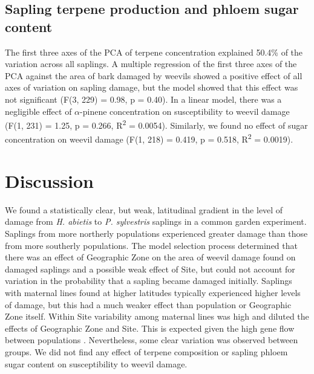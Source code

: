 \documentclass[a4paper, 11pt]{article}
\begin{document}
\subsection*{Sapling terpene production and phloem sugar content}

The first three axes of the PCA of terpene concentration explained 50.4\% of the variation across all saplings. A multiple regression of the first three axes of the PCA against the area of bark damaged by weevils showed a positive effect of all axes of variation on sapling damage, but the model showed that this effect was not significant (F(3, 229) = 0.98, p = 0.40). In a linear model, there was a negligible effect of $\alpha$-pinene concentration on susceptibility to weevil damage (F(1, 231) = 1.25, p = 0.266, R\textsuperscript{2} = 0.0054). Similarly, we found no effect of sugar concentration on weevil damage (F(1, 218) = 0.419, p = 0.518, R\textsuperscript{2} = 0.0019). 

\section*{Discussion}

We found a statistically clear, but weak, latitudinal gradient in the level of damage from \textit{H. abietis} to \textit{P. sylvestris} saplings in a common garden experiment. Saplings from more northerly populations experienced greater damage than those from more southerly populations. The model selection process determined that there was an effect of Geographic Zone on the area of weevil damage found on damaged saplings and a possible weak effect of Site, but could not account for variation in the probability that a sapling became damaged initially. Saplings with maternal lines found at higher latitudes typically experienced higher levels of damage, but this had a much weaker effect than population or Geographic Zone itself. Within Site variability among maternal lines was high and diluted the effects of Geographic Zone and Site. This is expected given the high gene flow between populations \citep{Donnelly2018}. Nevertheless, some clear variation was observed between groups. We did not find any effect of terpene composition or sapling phloem sugar content on susceptibility to weevil damage.
\end{document}
